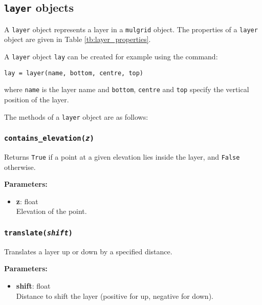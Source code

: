 \subsection{\texttt{layer} objects}
\label{layerobjects}

A \texttt{layer} object represents a layer in a \texttt{mulgrid} object. The properties of a \texttt{layer} object are given in Table \ref{tb:layer_properties}.

A \texttt{layer} object \texttt{lay} can be created for example using the command:

\begin{lstlisting}
lay = layer(name, bottom, centre, top)
\end{lstlisting}

where \texttt{name} is the layer name and \texttt{bottom}, \texttt{centre} and \texttt{top} specify the vertical position of the layer.

The methods of a \texttt{layer} object are as follows:

\begin{snugshade}
\subsubsection{\texttt{contains\_elevation(\emph{z})}}
\end{snugshade}

Returns \texttt{True} if a point at a given elevation lies inside the layer, and \texttt{False} otherwise.

\textbf{Parameters:}
\begin{itemize}
\item \textbf{z}: float\\
   Elevation of the point.
\end{itemize}

\begin{snugshade}
\subsubsection{\texttt{translate(\emph{shift})}}
\end{snugshade}

Translates a layer up or down by a specified distance.

\textbf{Parameters:}
\begin{itemize}
\item \textbf{shift}: float\\
  Distance to shift the layer (positive for up, negative for down).
\end{itemize}

